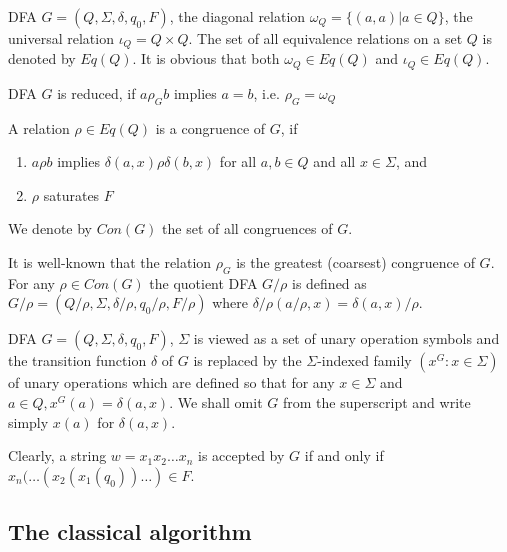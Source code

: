 \begin{definition}
	DFA $G=(Q,\Sigma,\delta,q_0,F)$, the diagonal relation $\omega_Q=\{(a,a)|a\in Q \}$, the universal relation $\iota_Q=Q\times Q$. The set of all equivalence relations on a set $Q$ is denoted by $Eq(Q)$. It is obvious that both $\omega_Q\in Eq(Q)$ and $\iota_Q \in Eq(Q)$. 
\end{definition}

\begin{definition}
	DFA $G$ is reduced, if $a\rho_G b$ implies $a=b$, i.e. $\rho_G=\omega_Q$
\end{definition}

\begin{definition}[$Con(G)$]
	A relation $\rho\in Eq(Q)$ is a congruence of $G$, if 
	\begin{enumerate}[(1) ]
		\item $a\rho b$ implies $\delta(a,x)\rho\delta(b,x)$ for all $a,b\in Q$ and all $x\in \Sigma$, and
		\item $\rho$ saturates $F$ 
	\end{enumerate} 
	We denote by $Con(G)$ the set of all congruences of $G$. 
\end{definition}

\begin{definition}
	It is well-known that the relation $\rho_G$ is the greatest (coarsest)  congruence of $G$. For any $\rho\in Con(G)$ the quotient DFA $G/\rho$ is defined as $G/\rho=(Q/\rho,\Sigma,\delta/\rho,q_0/\rho,F/\rho)$ where $\delta/\rho(a/\rho,x)=\delta(a,x)/\rho$. 
\end{definition}

\begin{definition}
	DFA $G=(Q,\Sigma,\delta,q_0,F)$, $\Sigma$ is viewed as a set of unary operation symbols and the transition function $\delta$ of $G$ is replaced by the $\Sigma$-indexed family $(x^G:x\in\Sigma)$ of unary operations which are defined so that for any $x\in\Sigma$ and $a\in Q, x^G(a)=\delta(a,x)$. We shall omit $G$ from the superscript and write simply $x(a)$ for $\delta(a,x)$. 
	
	Clearly, a string $w=x_1x_2\dots x_n$ is accepted by $G$ if and only if $x_n(\dots(x_2(x_1(q_0))\dots)\in F$. 
\end{definition}

\subsection{The classical algorithm}

